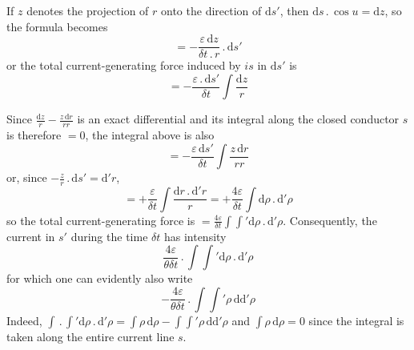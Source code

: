 If $z$ denotes the projection of $r$ onto the direction of $\mathrm ds'$, then $\mathrm ds\,.\,\cos u=\mathrm dz$, so the formula becomes
\[
=-\frac{\varepsilon\,\mathrm dz}{\delta t\,.\,r}\,.\,\mathrm ds'
\]
or the total current-generating force induced by $is$ in $\mathrm ds'$ is
\[
=-\frac{\varepsilon\,.\,\mathrm ds'}{\delta t}\int\frac{\mathrm dz}{r}
\]

Since $\frac{\mathrm dz}{r}-\frac{z\,\mathrm dr}{rr}$ is an exact differential and its integral along the closed conductor $s$ is therefore $=0$, the integral above is also
\[
=-\frac{\varepsilon\,\mathrm ds'}{\delta t}\int\frac{z\,\mathrm dr}{rr}
\]
or, since $-\frac{z}{r}\,.\,\mathrm ds'=\mathrm d'r$,
\[
=+\frac{\varepsilon}{\delta t}\int\frac{\mathrm dr\,.\,\mathrm d'r}{r}=+\frac{4\varepsilon}{\delta t}\int\mathrm d\rho\,.\,\mathrm d'\rho
\]
so the total current-generating force is $=\frac{4\varepsilon}{\delta t}\int\int'\mathrm d\rho\,.\,\mathrm d'\rho$. Consequently, the current in $s'$ during the time $\delta t$ has intensity
\[
\frac{4\varepsilon}{\theta\delta t}\,.\,\int\int'\mathrm d\rho\,.\,\mathrm d'\rho
\]
for which one can evidently also write
\[
-\frac{4\varepsilon}{\theta\delta t}\,.\,\int\int'\rho\,\mathrm d\mathrm d'\rho
\]
Indeed, $\int\,.\,\int'\mathrm d\rho\,.\,\mathrm d'\rho=\int\rho\,\mathrm d\rho-\int\int'\rho\,\mathrm d\mathrm d'\rho$ and $\int\rho\,\mathrm d\rho=0$ since the integral is taken along the entire current line $s$.

